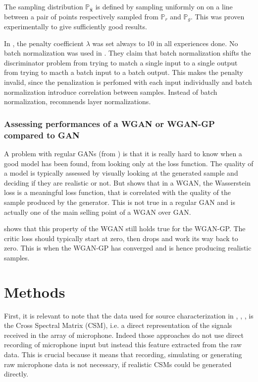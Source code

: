 \documentclass[11pt,a4paper,twoside]{report}
\begin{document}
The sampling distribution $\mathbb{P}_{\hat{\mathbf{x}}}$ is defined by sampling uniformly on on a line between a pair of points respectively sampled from $\mathbb{P}_{r}$ and $\mathbb{P}_{g}$. This was proven experimentally to give sufficiently good results.

In \cite{DBLP:journals/corr/GulrajaniAADC17}, the penalty coefficient $\lambda$ was set always to 10 in all experiences done. No batch normalization was used in \cite{DBLP:journals/corr/GulrajaniAADC17}. They claim that batch normalization shifts the discriminator problem from trying to match a single input to a single output from trying to macth a batch input to a batch output. This makes the penalty invalid, since the penalization is perfomed with each input individually and batch normalization introduce correlation between samples. Instead of batch normalization, \cite{DBLP:journals/corr/GulrajaniAADC17} recomnends layer normalizations.

\subsection{Assessing performances of a WGAN or WGAN-GP compared to GAN}

A problem with regular GANs (from \cite{goodfellow2020generative}) is that it is really hard to know when a good model has been found, from looking only at the loss function. The quality of a model is typically assessed by visually looking at the generated sample and deciding if they are realistic or not. But \cite{arjovsky2017wasserstein} shows that in a WGAN, the Wasserstein loss is a meaningful loss function, that is correlated with the quality of the sample produced by the generator. This is not true in a regular GAN and is actually one of the main selling point of a WGAN over GAN.

\cite{DBLP:journals/corr/GulrajaniAADC17} shows that this property of the WGAN still holds true for the WGAN-GP. The critic loss should typically start at zero, then drops and work its way back to zero. This is when the WGAN-GP has converged and is hence producing realistic samples.

\chapter{Methods}

First, it is relevant to note that the data used for source characterization in \cite{castellini2021neural}, \cite{lee2021deep}, \cite{ma2019phased}, \cite{xu2021deep} is the Cross Spectral Matrix (CSM), i.e. a direct representation of the signals received in the array of microphone. Indeed those approaches do not use direct recording of microphone input but instead this feature extracted from the raw data. This is crucial because it means that recording, simulating or generating raw microphone data is not necessary, if realistic CSMs could be generated directly.
\end{document}

